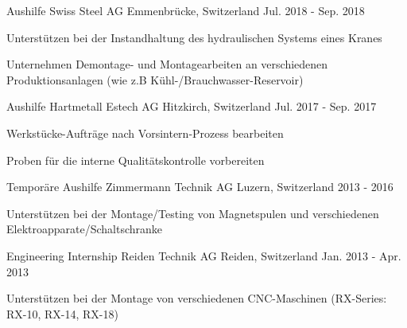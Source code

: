 \begin{cventries}
\cventry
	{Aushilfe} %
	{Swiss Steel AG} %
	{Emmenbrücke, Switzerland} %
	{Jul. 2018 - Sep. 2018} %
	{
		\begin{cvitems} %
			\item {Unterstützen bei der Instandhaltung des hydraulischen Systems eines Kranes}
			\item {Unternehmen Demontage- und Montagearbeiten an verschiedenen Produktionsanlagen (wie z.B Kühl-/Brauchwasser-Reservoir)}
		\end{cvitems}
}	

\cventry
	{Aushilfe} %
	{Hartmetall Estech AG} %
	{Hitzkirch, Switzerland} %
	{Jul. 2017 - Sep. 2017} %
	{
		\begin{cvitems} %
			\item {Werkstücke-Aufträge nach Vorsintern-Prozess bearbeiten}
			\item {Proben für die interne Qualitätskontrolle vorbereiten}
		\end{cvitems}
}

\cventry
	{Temporäre Aushilfe} %
	{Zimmermann Technik AG} %
	{Luzern, Switzerland} %
	{2013 - 2016} %
	{
		\begin{cvitems} %
			\item {Unterstützen bei der Montage/Testing von Magnetspulen und verschiedenen Elektroapparate/Schaltschranke}
		\end{cvitems}
	}	

  \cventry
    {Engineering Internship} %
    {Reiden Technik AG} %
    {Reiden, Switzerland} %
    {Jan. 2013 - Apr. 2013} %
    {
      \begin{cvitems} %
        \item {Unterstützen bei der Montage von verschiedenen CNC-Maschinen (RX-Series: RX-10, RX-14, RX-18)}
      \end{cvitems}
    }


\end{cventries}
